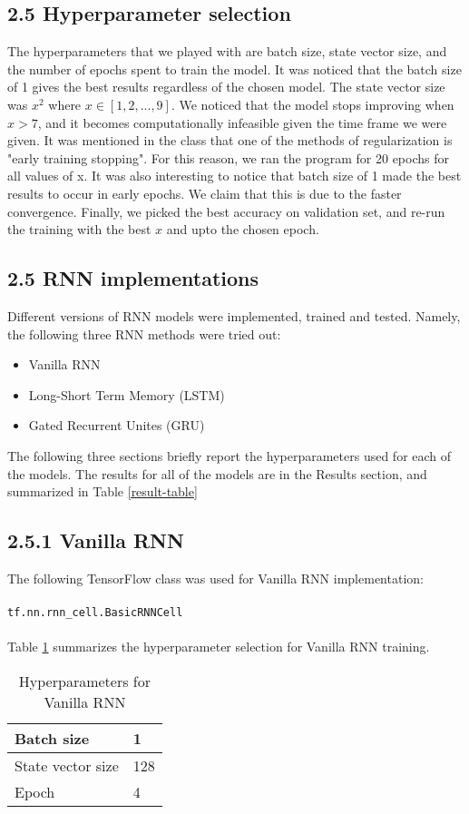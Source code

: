 \subsection*{2.5 Hyperparameter selection}
The hyperparameters that we played with are batch size, state vector size, and the number of epochs spent to train the model. It was noticed that the batch size of 1 gives the best results regardless of the chosen model. The state vector size was \(x^{2}\) where \(x \in [1,2,...,9]\). We noticed that the model stops improving when \(x>7\), and it becomes computationally infeasible given the time frame we were given. It was mentioned in the class that one of the methods of regularization is "early training stopping". For this reason, we ran the program for 20 epochs for all values of x. It was also interesting to notice that batch size of 1 made the best results to occur in early epochs. We claim that this is due to the faster convergence. Finally, we picked the best accuracy on validation set, and re-run the training with the best \(x\) and upto the chosen epoch. 

\subsection*{2.5 RNN implementations}
Different versions of RNN models were implemented, trained and tested. Namely, the following three RNN methods were tried out:
\begin{itemize}
	\item Vanilla RNN
	\item Long-Short Term Memory (LSTM)
	\item Gated Recurrent Unites (GRU)
\end{itemize}

The following three sections briefly report the hyperparameters used for each of the models. The results for all of the models are in the Results section, and summarized in Table \ref{result-table}
	
\subsection*{2.5.1 Vanilla RNN}
The following TensorFlow class was used for Vanilla RNN implementation:\\ \\
\texttt{tf.nn.rnn\_cell.BasicRNNCell}\\ \\
Table \ref{vanilla-table} summarizes the hyperparameter selection for Vanilla RNN training.
\begin{table}[h]
\centering
\begin{tabular}{|l|l|}
\hline
 Batch size & 1 \\ \hline
 State vector size & 128 \\ \hline
 Epoch & 4 \\ \hline
\end{tabular}
\caption{Hyperparameters for Vanilla RNN}
\label{vanilla-table}
\end{table}

